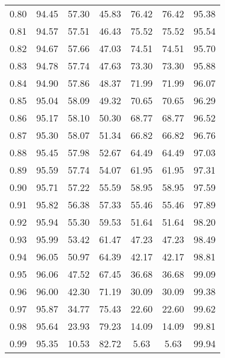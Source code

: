 \begin{tabular}{|c|c|c|c|c|c|c|}
      0.80 &     94.45 &     57.30 &      45.83 &   76.42 &      76.42 &         95.38 \\
      0.81 &     94.57 &     57.51 &      46.43 &   75.52 &      75.52 &         95.54 \\
      0.82 &     94.67 &     57.66 &      47.03 &   74.51 &      74.51 &         95.70 \\
      0.83 &     94.78 &     57.74 &      47.63 &   73.30 &      73.30 &         95.88 \\
      0.84 &     94.90 &     57.86 &      48.37 &   71.99 &      71.99 &         96.07 \\
      0.85 &     95.04 &     58.09 &      49.32 &   70.65 &      70.65 &         96.29 \\
      0.86 &     95.17 &     58.10 &      50.30 &   68.77 &      68.77 &         96.52 \\
      0.87 &     95.30 &     58.07 &      51.34 &   66.82 &      66.82 &         96.76 \\
      0.88 &     95.45 &     57.98 &      52.67 &   64.49 &      64.49 &         97.03 \\
      0.89 &     95.59 &     57.74 &      54.07 &   61.95 &      61.95 &         97.31 \\
      0.90 &     95.71 &     57.22 &      55.59 &   58.95 &      58.95 &         97.59 \\
      0.91 &     95.82 &     56.38 &      57.33 &   55.46 &      55.46 &         97.89 \\
      0.92 &     95.94 &     55.30 &      59.53 &   51.64 &      51.64 &         98.20 \\
      0.93 &     95.99 &     53.42 &      61.47 &   47.23 &      47.23 &         98.49 \\
      0.94 &     96.05 &     50.97 &      64.39 &   42.17 &      42.17 &         98.81 \\
      0.95 &     96.06 &     47.52 &      67.45 &   36.68 &      36.68 &         99.09 \\
      0.96 &     96.00 &     42.30 &      71.19 &   30.09 &      30.09 &         99.38 \\
      0.97 &     95.87 &     34.77 &      75.43 &   22.60 &      22.60 &         99.62 \\
      0.98 &     95.64 &     23.93 &      79.23 &   14.09 &      14.09 &         99.81 \\
      0.99 &     95.35 &     10.53 &      82.72 &    5.63 &       5.63 &         99.94 \\
\bottomrule
\end{tabular}
